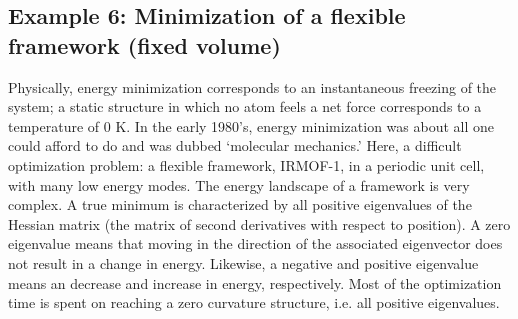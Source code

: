 \subsection*{Example 6: Minimization of a flexible framework (fixed volume)}

Physically, energy minimization corresponds to an instantaneous freezing of the system; a static structure in 
which no atom feels a net force corresponds to a temperature of 0 K. In the early 1980's, energy minimization was 
about all one could afford to do and was dubbed `molecular mechanics.' Here, a difficult optimization problem:
a flexible framework, IRMOF-1, in a periodic unit cell, with many low energy modes.
The energy landscape of a framework is very complex. A true minimum is characterized by
all positive eigenvalues of the Hessian matrix (the matrix of second derivatives with respect to position). A
zero eigenvalue means that moving in the direction of the associated eigenvector does not result in a change in
energy. Likewise, a negative and positive eigenvalue means an decrease and increase in energy, respectively.
Most of the optimization time is spent on reaching a zero curvature structure, i.e. all positive eigenvalues.

